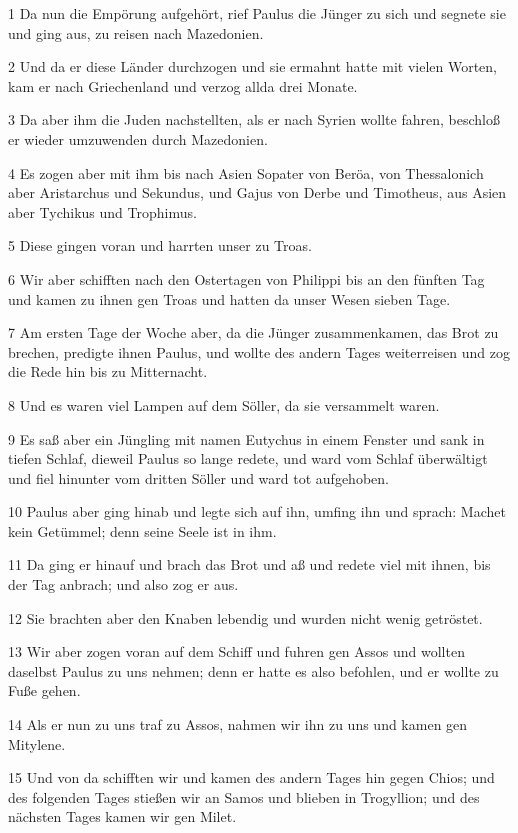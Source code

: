 \par 1 Da nun die Empörung aufgehört, rief Paulus die Jünger zu sich und segnete sie und ging aus, zu reisen nach Mazedonien.
\par 2 Und da er diese Länder durchzogen und sie ermahnt hatte mit vielen Worten, kam er nach Griechenland und verzog allda drei Monate.
\par 3 Da aber ihm die Juden nachstellten, als er nach Syrien wollte fahren, beschloß er wieder umzuwenden durch Mazedonien.
\par 4 Es zogen aber mit ihm bis nach Asien Sopater von Beröa, von Thessalonich aber Aristarchus und Sekundus, und Gajus von Derbe und Timotheus, aus Asien aber Tychikus und Trophimus.
\par 5 Diese gingen voran und harrten unser zu Troas.
\par 6 Wir aber schifften nach den Ostertagen von Philippi bis an den fünften Tag und kamen zu ihnen gen Troas und hatten da unser Wesen sieben Tage.
\par 7 Am ersten Tage der Woche aber, da die Jünger zusammenkamen, das Brot zu brechen, predigte ihnen Paulus, und wollte des andern Tages weiterreisen und zog die Rede hin bis zu Mitternacht.
\par 8 Und es waren viel Lampen auf dem Söller, da sie versammelt waren.
\par 9 Es saß aber ein Jüngling mit namen Eutychus in einem Fenster und sank in tiefen Schlaf, dieweil Paulus so lange redete, und ward vom Schlaf überwältigt und fiel hinunter vom dritten Söller und ward tot aufgehoben.
\par 10 Paulus aber ging hinab und legte sich auf ihn, umfing ihn und sprach: Machet kein Getümmel; denn seine Seele ist in ihm.
\par 11 Da ging er hinauf und brach das Brot und aß und redete viel mit ihnen, bis der Tag anbrach; und also zog er aus.
\par 12 Sie brachten aber den Knaben lebendig und wurden nicht wenig getröstet.
\par 13 Wir aber zogen voran auf dem Schiff und fuhren gen Assos und wollten daselbst Paulus zu uns nehmen; denn er hatte es also befohlen, und er wollte zu Fuße gehen.
\par 14 Als er nun zu uns traf zu Assos, nahmen wir ihn zu uns und kamen gen Mitylene.
\par 15 Und von da schifften wir und kamen des andern Tages hin gegen Chios; und des folgenden Tages stießen wir an Samos und blieben in Trogyllion; und des nächsten Tages kamen wir gen Milet.
